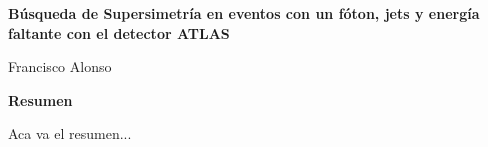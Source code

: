 \thispagestyle{plain}
\begin{center}
  \Large
  \textbf{Búsqueda de Supersimetría en eventos con un fóton,
      jets y energía faltante con el detector ATLAS}

  \vspace{0.4cm}
  \large

  \vspace{0.4cm}
  Francisco Alonso

  \vspace{2cm}
  \textbf{Resumen}
\end{center}

Aca va el resumen...
